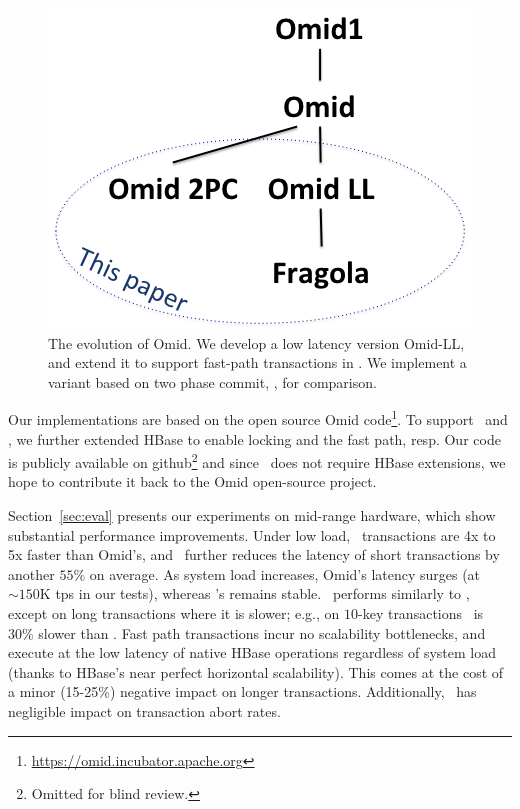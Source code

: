\begin{figure}
  \centerline{
        \includegraphics[width=0.75\columnwidth]{figs/OmidEvolution}	
  }
\caption{The evolution of Omid. We develop a low latency version Omid-LL, and extend it to support fast-path transactions in \sys.
              We implement a variant based on two phase commit, \syspc, for comparison.}
\label{fig:evolution}
\end{figure}


Our implementations are 
based on the open source Omid code\footnote{\url{https://omid.incubator.apache.org}}.
To support \syspc\ and \sys, we further extended  HBase  to enable locking and the fast path, resp. 
Our code is publicly available on github\footnote{\small{Omitted for blind review.}}
and since \sysll\ does not require HBase extensions, we hope to contribute it back to the Omid open-source project.
 
 
 Section~\ref{sec:eval} presents our experiments on mid-range hardware, which show substantial performance improvements.
Under low load, \sysll\ transactions are 4x to 5x faster than Omid's, 
and \sys\ further reduces the latency of short transactions by another $55\%$ on average.
As system load increases, Omid's latency surges (at  $\sim\!\!\!150$K tps in our tests),  
whereas \sys's remains stable. \syspc\ performs similarly to \sysll, except on long transactions
where it is slower; e.g., on $10$-key transactions \syspc\ is $30\%$ slower than \sysll.
Fast path transactions incur no scalability
bottlenecks, and execute at the low latency of native HBase operations regardless of system load
(thanks to HBase's near perfect horizontal scalability).
This comes at the cost of a minor (15-25\%) negative impact on longer transactions. 
Additionally, \sys\ has negligible impact on  transaction abort rates.

